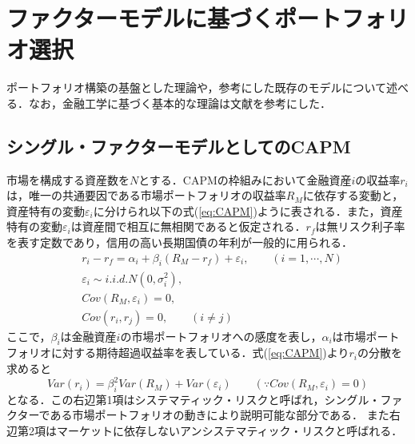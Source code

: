 \documentclass[11pt]{jreport}
\begin{document}
\chapter{ファクターモデルに基づくポートフォリオ選択}

ポートフォリオ構築の基盤とした理論や，参考にした既存のモデルについて述べる．なお，金融工学に基づく基本的な理論は文献\cite{analyst}\cite{finance}を参考にした．
\section{シングル・ファクターモデルとしてのCAPM}
市場を構成する資産数を$N$とする．CAPMの枠組みにおいて金融資産$i$の収益率$r_i$は，唯一の共通要因である市場ポートフォリオの収益率$R_M$に依存する変動と，資産特有の変動$\varepsilon_i$に分けられ以下の式(\ref{eq:CAPM})ように表される．また，資産特有の変動$\varepsilon_i$は資産間で相互に無相関であると仮定される．$r_f$は無リスク利子率を表す定数であり，信用の高い長期国債の年利が一般的に用られる．
\begin{equation}
\begin{split}
&r_i - r_f = \alpha_i + \beta_i(R_M - r_f) + \varepsilon_i,\qquad(i=1,\cdots,N)\\
&\varepsilon_i \sim i.i.d.N(0,\sigma_i^2),\\
&Cov(R_M, \varepsilon_i) = 0,\\
&Cov(r_i, r_j) = 0, \qquad (i \neq j)
\label{eq:CAPM}
\end{split}
\end{equation}
ここで，$\beta_i$は金融資産$i$の市場ポートフォリオへの感度を表し，$\alpha_i$は市場ポートフォリオに対する期待超過収益率を表している．式(\ref{eq:CAPM})より$r_i$の分散を求めると
\begin{equation}
Var(r_i) = \beta_i^2Var(R_M) + Var(\varepsilon_i) \qquad (\text{∵}Cov(R_M, \varepsilon_i) = 0)
\label{eq:CAPM_var}
\end{equation}
となる．この右辺第1項はシステマティック・リスクと呼ばれ，シングル・ファクターである市場ポートフォリオの動きにより説明可能な部分である．
また右辺第2項はマーケットに依存しないアンシステマティック・リスクと呼ばれる．
\end{document}
